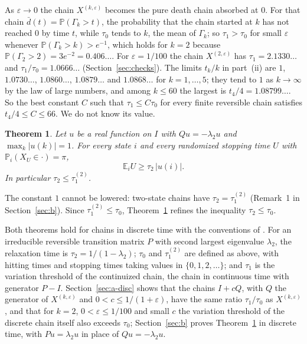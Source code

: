 \documentclass[11pt]{amsart}
\newtheorem{theorem}{Theorem}
\numberwithin{equation}{section}
\newcommand{\Pp}{\mathbb P}
\newcommand{\E}{\mathbb E}
\newcommand{\dbar}{\bar d}
\begin{document}
As $\varepsilon\to0$ the chain $X^{(k,\varepsilon)}$ becomes the pure death chain absorbed at $0$. For that chain $\dbar(t)=\Pp(\Gamma_k>t)$, the probability that the chain started at $k$ has not reached $0$ by time $t$, while $\tau_0$ tends to $k$, the mean of $\Gamma_k$; so $\tau_1>\tau_0$ for small $\varepsilon$ whenever $\Pp(\Gamma_k>k)>e^{-1}$, which holds for $k=2$ because $\Pp(\Gamma_2>2)=3e^{-2}=0.406\ldots$. For $\varepsilon=1/100$ the chain $X^{(2,\varepsilon)}$ has $\tau_1=2.1330\ldots$ and $\tau_1/\tau_0=1.0666\ldots$ (Section~\ref{sec:checks}). The limits $t_k/k$ in part~(ii) are $1$, $1.0730\ldots$, $1.0860\ldots$, $1.0879\ldots$ and $1.0868\ldots$ for $k=1,\dots,5$; they tend to $1$ as $k\to\infty$ by the law of large numbers, and among $k\le60$ the largest is $t_4/4=1.08799\ldots$. So the best constant $C$ such that $\tau_1\le C\tau_0$ for every finite reversible chain satisfies $t_4/4\le C\le66$. We do not know its value.

\begin{theorem}\label{thm:b}
Let $u$ be a real function on $I$ with $Qu=-\lambda_2u$ and $\max_k|u(k)|=1$. For every state $i$ and every randomized stopping time $U$ with $\Pp_i(X_U\in\cdot)=\pi$,
\[
\E_iU\ge\tau_2\,|u(i)|.
\]
In particular $\tau_2\le\tau_1^{(2)}$.
\end{theorem}

The constant $1$ cannot be lowered: two-state chains have $\tau_2=\tau_1^{(2)}$ (Remark~1 in Section~\ref{sec:b}). Since $\tau_1^{(2)}\le\tau_0$, Theorem~\ref{thm:b} refines the inequality $\tau_2\le\tau_0$.

Both theorems hold for chains in discrete time with the conventions of \cite[(3.39) and Section~4.3.1]{AF}. For an irreducible reversible transition matrix $P$ with second largest eigenvalue $\lambda_2$, the relaxation time is $\tau_2=1/(1-\lambda_2)$; $\tau_0$ and $\tau_1^{(2)}$ are defined as above, with hitting times and stopping times taking values in $\{0,1,2,\dots\}$; and $\tau_1$ is the variation threshold of the continuized chain, the chain in continuous time with generator $P-I$. Section~\ref{sec:a-disc} shows that the chains $I+cQ$, with $Q$ the generator of $X^{(k,\varepsilon)}$ and $0<c\le1/(1+\varepsilon)$, have the same ratio $\tau_1/\tau_0$ as $X^{(k,\varepsilon)}$, and that for $k=2$, $0<\varepsilon\le1/100$ and small $c$ the variation threshold of the discrete chain itself also exceeds $\tau_0$; Section~\ref{sec:b} proves Theorem~\ref{thm:b} in discrete time, with $Pu=\lambda_2u$ in place of $Qu=-\lambda_2u$.
\end{document}
